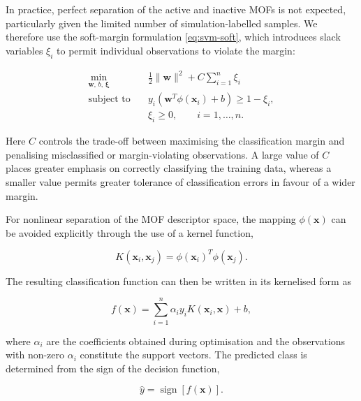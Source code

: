 \documentclass[twoside,twocolumn,9pt]{article}
\begin{document}
In practice, perfect separation of the active and inactive MOFs is not expected, particularly given the limited number of simulation-labelled samples. We therefore use the soft-margin formulation \eqref{eq:svm-soft}, which introduces slack variables $\xi_i$ to permit individual observations to violate the margin:

\begin{equation}
	\begin{aligned}
		\min_{\mathbf{w},\,b,\,\boldsymbol{\xi}}\quad
		& \frac{1}{2}\|\mathbf{w}\|^2
		+ C\sum_{i=1}^{n}\xi_i \\
		\text{subject to}\quad
		& y_i\left(\mathbf{w}^{T}\phi(\mathbf{x}_i)+b\right)
		\geq 1-\xi_i, \\
		& \xi_i \geq 0,
		\qquad i=1,\ldots,n.
	\end{aligned}
	\label{eq:svm-soft}
\end{equation}

Here $C$ controls the trade-off between maximising the classification margin and penalising misclassified or margin-violating observations. A large value of $C$ places greater emphasis on correctly classifying the training data, whereas a smaller value permits greater tolerance of classification errors in favour of a wider margin.

For nonlinear separation of the MOF descriptor space, the mapping $\phi(\mathbf{x})$ can be avoided explicitly through the use of a kernel function,

\begin{equation}
	K(\mathbf{x}_i,\mathbf{x}_j)
	=
	\phi(\mathbf{x}_i)^{T}\phi(\mathbf{x}_j).
	\label{eq:svm-kernel}
\end{equation}

The resulting classification function can then be written in its kernelised form as

\begin{equation}
	f(\mathbf{x})
	=
	\sum_{i=1}^{n}\alpha_i y_i
	K(\mathbf{x}_i,\mathbf{x}) + b,
	\label{eq:svm-decision}
\end{equation}

where $\alpha_i$ are the coefficients obtained during optimisation and the observations with non-zero $\alpha_i$ constitute the support vectors. The predicted class is determined from the sign of the decision function,

\begin{equation}
	\hat{y} =
	\operatorname{sign}\left[f(\mathbf{x})\right].
	\label{eq:svm-classification}
\end{equation}
\end{document}
